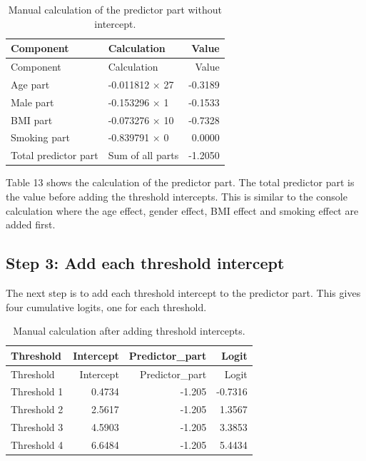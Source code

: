 \documentclass{article}
\begin{document}
\begin{longtable}[]{@{}llr@{}}
\caption{Manual calculation of the predictor part without
intercept.}\tabularnewline
\toprule\noalign{}
Component & Calculation & Value \\
\midrule\noalign{}
\endfirsthead
\toprule\noalign{}
Component & Calculation & Value \\
\midrule\noalign{}
\endhead
\bottomrule\noalign{}
\endlastfoot
Age part & -0.011812 × 27 & -0.3189 \\
Male part & -0.153296 × 1 & -0.1533 \\
BMI part & -0.073276 × 10 & -0.7328 \\
Smoking part & -0.839791 × 0 & 0.0000 \\
Total predictor part & Sum of all parts & -1.2050 \\
\end{longtable}

Table 13 shows the calculation of the predictor part. The total
predictor part is the value before adding the threshold intercepts. This
is similar to the console calculation where the age effect, gender
effect, BMI effect and smoking effect are added first.

\subsection{Step 3: Add each threshold
intercept}\label{step-3-add-each-threshold-intercept}

The next step is to add each threshold intercept to the predictor part.
This gives four cumulative logits, one for each threshold.

\begin{longtable}[]{@{}lrrr@{}}
\caption{Manual calculation after adding threshold
intercepts.}\tabularnewline
\toprule\noalign{}
Threshold & Intercept & Predictor\_part & Logit \\
\midrule\noalign{}
\endfirsthead
\toprule\noalign{}
Threshold & Intercept & Predictor\_part & Logit \\
\midrule\noalign{}
\endhead
\bottomrule\noalign{}
\endlastfoot
Threshold 1 & 0.4734 & -1.205 & -0.7316 \\
Threshold 2 & 2.5617 & -1.205 & 1.3567 \\
Threshold 3 & 4.5903 & -1.205 & 3.3853 \\
Threshold 4 & 6.6484 & -1.205 & 5.4434 \\
\end{longtable}
\end{document}
